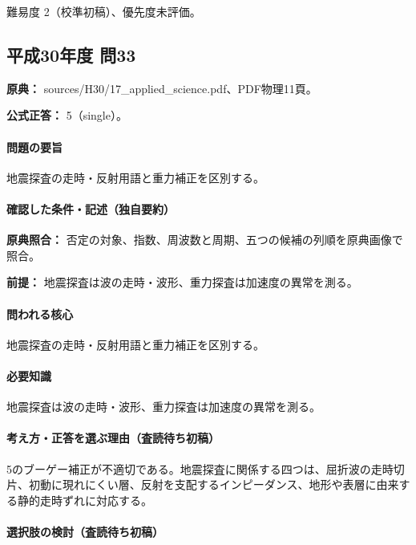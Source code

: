 \par 難易度 2（校準初稿）、優先度未評価。

\subsection{平成30年度 問33}
\label{q:h30-reg-applied-33}

\noindent\textbf{原典：} sources/H30/17\_applied\_science.pdf、PDF物理11頁。

\textbf{公式正答：} 5（single）。

\paragraph{問題の要旨} 地震探査の走時・反射用語と重力補正を区別する。

\paragraph{確認した条件・記述（独自要約）}\mbox{}\par

\noindent\textbf{原典照合：} 否定の対象、指数、周波数と周期、五つの候補の列順を原典画像で照合。\par

\noindent\textbf{前提：} 地震探査は波の走時・波形、重力探査は加速度の異常を測る。\par

\paragraph{問われる核心} 地震探査の走時・反射用語と重力補正を区別する。

\paragraph{必要知識} 地震探査は波の走時・波形、重力探査は加速度の異常を測る。

\paragraph{考え方・正答を選ぶ理由（査読待ち初稿）} 5のブーゲー補正が不適切である。地震探査に関係する四つは、屈折波の走時切片、初動に現れにくい層、反射を支配するインピーダンス、地形や表層に由来する静的走時ずれに対応する。

\paragraph{選択肢の検討（査読待ち初稿）}\mbox{}\par

